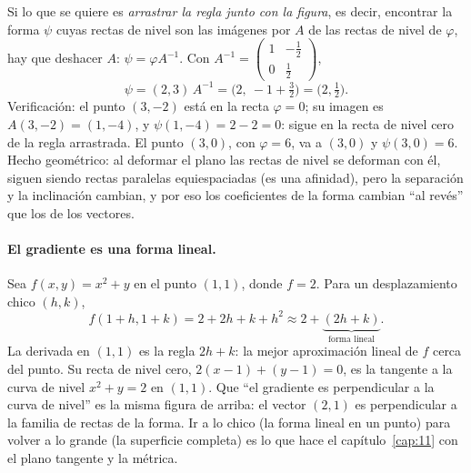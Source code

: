 Si lo que se quiere es \emph{arrastrar la regla junto con la figura}, es decir, encontrar
la forma \(\psi\) cuyas rectas de nivel son las imágenes por \(A\) de las rectas de nivel
de \(\varphi\), hay que deshacer \(A\): \(\psi=\varphi A^{-1}\). Con
\(A^{-1}=\begin{pmatrix}1&-\tfrac12\\0&\tfrac12\end{pmatrix}\),
\[
  \psi=(2,3)\,A^{-1}=\bigl(2,\ -1+\tfrac32\bigr)=\bigl(2,\tfrac12\bigr).
\]
Verificación: el punto \((3,-2)\) está en la recta \(\varphi=0\); su imagen es
\(A(3,-2)=(1,-4)\), y \(\psi(1,-4)=2-2=0\): sigue en la recta de nivel cero de la regla
arrastrada. El punto \((3,0)\), con \(\varphi=6\), va a \((3,0)\) y \(\psi(3,0)=6\).
Hecho geométrico: al deformar el plano las rectas de nivel se deforman con él, siguen
siendo rectas paralelas equiespaciadas (es una afinidad), pero la separación y la
inclinación cambian, y por eso los coeficientes de la forma cambian ``al revés'' que los
de los vectores.

\paragraph{El gradiente es una forma lineal.} Sea \(f(x,y)=x^2+y\) en el punto \((1,1)\),
donde \(f=2\). Para un desplazamiento chico \((h,k)\),
\[
  f(1+h,1+k)=2+2h+k+h^2\approx 2+\underbrace{(2h+k)}_{\text{forma lineal}} .
\]
La derivada en \((1,1)\) es la regla \(2h+k\): la mejor aproximación lineal de \(f\) cerca
del punto. Su recta de nivel cero, \(2(x-1)+(y-1)=0\), es la tangente a la curva de nivel
\(x^2+y=2\) en \((1,1)\). Que ``el gradiente es perpendicular a la curva de nivel'' es la
misma figura de arriba: el vector \((2,1)\) es perpendicular a la familia de rectas de la
forma. Ir a lo chico (la forma lineal en un punto) para volver a lo grande (la superficie
completa) es lo que hace el capítulo~\ref{cap:11} con el plano tangente y la métrica.

